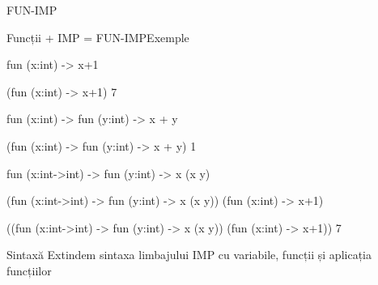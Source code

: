 \documentclass[xcolor=pdftex,romanian,colorlinks]{beamer}
\begin{document}
\begin{section}{FUN-IMP}
\begin{frame}[fragile]{Funcții + IMP = FUN-IMP}{Exemple}
\begin{asciiml}
fun (x:int) -> x+1

(fun (x:int) -> x+1) 7

fun (x:int) -> fun (y:int) -> x + y

(fun (x:int) -> fun (y:int) -> x + y) 1

fun (x:int->int) -> fun (y:int) -> x (x y)

(fun (x:int->int) -> fun (y:int) -> x (x y)) (fun (x:int) -> x+1)

((fun (x:int->int) -> fun (y:int) -> x (x y)) (fun (x:int) -> x+1)) 7
\end{asciiml}
\end{frame}


\begin{frame}{}{Sintaxă}
Extindem sintaxa limbajului IMP cu variabile, funcții și aplicația funcțiilor

\end{frame}



\end{section}
\end{document}

